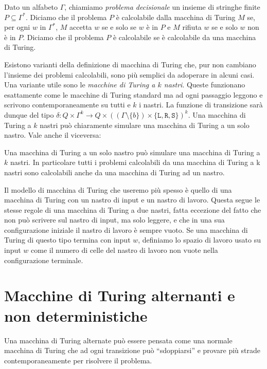 \begin{definizione}
\label{def:problem}
 Dato un alfabeto $\Gamma$, chiamiamo \emph{problema decisionale} un insieme di stringhe finite
 $P \subseteq \Gamma^\ast$. Diciamo che il problema $P$ è calcolabile dalla macchina
 di Turing $M$ se, per ogni $w$ in $\Gamma^\ast$, $M$ accetta $w$ se e solo se $w$
 è in $P$ e $M$ rifiuta $w$ se e solo $w$ non è in $P$.
 Diciamo che il problema $P$ è calcolabile se è calcolabile da una
 macchina di Turing.
\end{definizione}

Esistono varianti della definizione di macchina di Turing che, pur non cambiano
l'insieme dei problemi calcolabili, sono più semplici da adoperare in alcuni
casi. Una variante utile sono le
\emph{macchine di Turing a $k$ nastri}. Queste funzionano esattamente come le
macchine di Turing standard ma ad ogni passaggio leggono e scrivono contemporaneamente su
tutti e $k$ i nastri. La funzione di transizione sarà dunque del tipo
$\delta:  Q \times \Gamma^k \to Q \times ((\Gamma \setminus \{b\}) \times \{\texttt{L},\texttt{R},\texttt{S}\})^k$.
Una macchina di Turing a $k$ nastri può chiaramente simulare una macchina di Turing
a un solo nastro. Vale anche il viceversa:

\begin{fatto}
Una macchina di Turing a un solo nastro può simulare una macchina di Turing
a $k$ nastri.
In particolare tutti i problemi calcolabili da una macchina
di Turing a k nastri sono calcolabili anche da una macchina di Turing ad un nastro.
\end{fatto}

Il modello di macchina di Turing che useremo più spesso è quello di una macchina di Turing
con un nastro di input e un nastro di lavoro. Questa segue le stesse regole di
una macchina di Turing a due nastri, fatta eccezione del fatto che non può scrivere
sul nastro di input, ma solo leggere, e che in una sua configurazione iniziale
il nastro di lavoro è sempre vuoto. Se una macchina di Turing di questo tipo
termina con input $w$, definiamo lo spazio di lavoro usato su input $w$
come il numero di celle del nastro di lavoro non vuote nella configurazione terminale.


\section{Macchine di Turing alternanti e non deterministiche}
Una macchina di Turing alternate può essere pensata come una normale macchina di
Turing che ad ogni transizione può ``sdoppiarsi'' e provare più strade contemporaneamente
per risolvere il problema.

